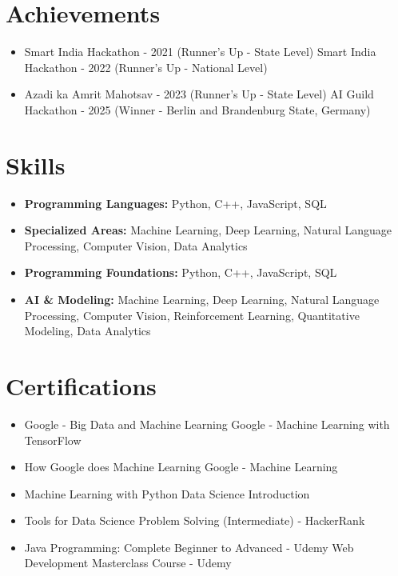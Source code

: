 \documentclass[a4paper,10pt]{article}
\begin{document}
\section*{Achievements}
\begin{itemize}
\item Smart India Hackathon - 2021 (Runner's Up - State Level) \hfill Smart India Hackathon - 2022 (Runner's Up - National Level)
\item Azadi ka Amrit Mahotsav - 2023 (Runner's Up - State Level) \hfill AI Guild Hackathon - 2025 (Winner - Berlin and Brandenburg State, Germany)
\end{itemize}

\section*{Skills}
\begin{itemize}
  \item \textbf{Programming Languages:} Python, C++, JavaScript, SQL
  \item \textbf{Specialized Areas:} Machine Learning, Deep Learning, Natural Language Processing, Computer Vision, Data Analytics
  \item \textbf{Programming Foundations:} Python, C++, JavaScript, SQL
  \item \textbf{AI \& Modeling:} Machine Learning, Deep Learning, Natural Language Processing, Computer Vision, Reinforcement Learning, Quantitative Modeling, Data Analytics
\end{itemize}

\section*{Certifications}
\begin{itemize}
\item Google - Big Data and Machine Learning \hfill Google - Machine Learning with TensorFlow
\item How Google does Machine Learning \hfill Google - Machine Learning
\item Machine Learning with Python \hfill Data Science Introduction
\item Tools for Data Science \hfill Problem Solving (Intermediate) - HackerRank
\item Java Programming: Complete Beginner to Advanced - Udemy \hfill Web Development Masterclass Course - Udemy
\end{itemize}
\end{document}
